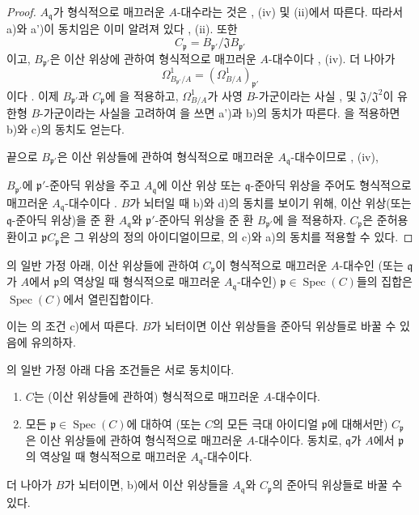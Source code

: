 \begin{proof}
$A_{\mathfrak q}$가 형식적으로 매끄러운 $A$-대수라는 것은
, (iv) 및 (ii)에서 따른다. 따라서 a)와 a')이
동치임은 이미 알려져 있다 , (ii). 또한
\[
  C_{\mathfrak p}=B_{\mathfrak p'}/\mathfrak J B_{\mathfrak p'}
\]
이고, $B_{\mathfrak p'}$은 이산 위상에 관하여 형식적으로 매끄러운
$A$-대수이다 , (iv). 더 나아가
\[
  \Omega^1_{B_{\mathfrak p'}/A}
  =(\Omega^1_{B/A})_{\mathfrak p'}
\]
이다 . 이제 $B_{\mathfrak p'}$과
$C_{\mathfrak p}$에 을 적용하고,
$\Omega^1_{B/A}$가 사영 $B$-가군이라는 사실
,  및
$\mathfrak J/\mathfrak J^2$이 유한형 $B$-가군이라는 사실을 고려하여
을 쓰면 a')과 b)의 동치가 따른다.
을 적용하면 b)와 c)의 동치도 얻는다.

끝으로 $B_{\mathfrak p'}$은 이산 위상들에 관하여 형식적으로 매끄러운
$A_{\mathfrak q}$-대수이므로 , (iv),


$B_{\mathfrak p'}$에 $\mathfrak p'$-준아딕 위상을 주고
$A_{\mathfrak q}$에 이산 위상 또는 $\mathfrak q$-준아딕 위상을
주어도 형식적으로 매끄러운 $A_{\mathfrak q}$-대수이다
. $B$가 뇌터일 때 b)와 d)의 동치를 보이기 위해,
이산 위상(또는 $\mathfrak q$-준아딕 위상)을 준 환
$A_{\mathfrak q}$와 $\mathfrak p'$-준아딕 위상을 준 환
$B_{\mathfrak p'}$에 을 적용하자.
$C_{\mathfrak p}$은 준허용환이고
$\mathfrak pC_{\mathfrak p}$은 그 위상의 정의 아이디얼이므로,
의 c)와 a)의 동치를 적용할 수 있다.
\end{proof}

\begin{corollary}[22.6.5]
\label{0.22.6.5-ko}
의 일반 가정 아래, 이산 위상들에 관하여
$C_{\mathfrak p}$이 형식적으로 매끄러운 $A$-대수인 (또는
$\mathfrak q$가 $A$에서 $\mathfrak p$의 역상일 때 형식적으로
매끄러운 $A_{\mathfrak q}$-대수인)
$\mathfrak p\in\operatorname{Spec}(C)$들의 집합은
$\operatorname{Spec}(C)$에서 열린집합이다.
\end{corollary}

이는 의 조건 c)에서 따른다. $B$가 뇌터이면 이산
위상들을 준아딕 위상들로 바꿀 수 있음에 유의하자.

\begin{corollary}[22.6.6]
\label{0.22.6.6-ko}
의 일반 가정 아래 다음 조건들은 서로 동치이다.
\begin{enumerate}
  \item[a)] $C$는 (이산 위상들에 관하여) 형식적으로 매끄러운
  $A$-대수이다.
  \item[b)] 모든 $\mathfrak p\in\operatorname{Spec}(C)$에 대하여
  (또는 $C$의 모든 극대 아이디얼 $\mathfrak p$에 대해서만)
  $C_{\mathfrak p}$은 이산 위상들에 관하여 형식적으로 매끄러운
  $A$-대수이다. 동치로, $\mathfrak q$가 $A$에서 $\mathfrak p$의
  역상일 때 형식적으로 매끄러운 $A_{\mathfrak q}$-대수이다.
\end{enumerate}
더 나아가 $B$가 뇌터이면, b)에서 이산 위상들을
$A_{\mathfrak q}$와 $C_{\mathfrak p}$의 준아딕 위상들로 바꿀 수
있다.
\end{corollary}

